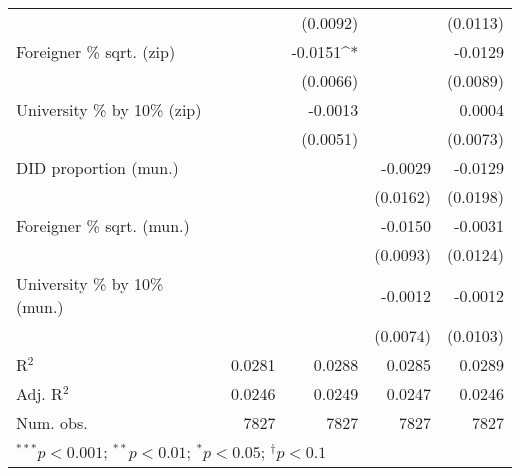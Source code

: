 \begin{tabular}{l D{.}{.}{4.7} D{.}{.}{4.7} D{.}{.}{4.7} D{.}{.}{4.7}}
                                  &               & (0.0092)      &               & (0.0113)      \\
Foreigner \% sqrt. (zip)          &               & -0.0151^{*}   &               & -0.0129       \\
                                  &               & (0.0066)      &               & (0.0089)      \\
University \% by 10\% (zip)       &               & -0.0013       &               & 0.0004        \\
                                  &               & (0.0051)      &               & (0.0073)      \\
DID proportion (mun.)             &               &               & -0.0029       & -0.0129       \\
                                  &               &               & (0.0162)      & (0.0198)      \\
Foreigner \% sqrt. (mun.)         &               &               & -0.0150       & -0.0031       \\
                                  &               &               & (0.0093)      & (0.0124)      \\
University \% by 10\% (mun.)      &               &               & -0.0012       & -0.0012       \\
                                  &               &               & (0.0074)      & (0.0103)      \\
\midrule
R$^2$                             & 0.0281        & 0.0288        & 0.0285        & 0.0289        \\
Adj. R$^2$                        & 0.0246        & 0.0249        & 0.0247        & 0.0246        \\
Num. obs.                         & 7827          & 7827          & 7827          & 7827          \\
\bottomrule
{}
\end{tabular}
